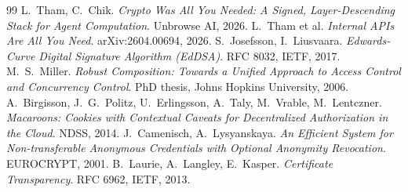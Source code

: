 \documentclass[11pt]{article}
\begin{document}
\begin{thebibliography}{99}
 L.~Tham, C.~Chik. \emph{Crypto Was All You Needed: A Signed,
Layer-Descending Stack for Agent Computation}. Unbrowse AI, 2026.
 L.~Tham et al. \emph{Internal APIs Are All You Need}.
arXiv:2604.00694, 2026.
 S.~Josefsson, I.~Liusvaara. \emph{Edwards-Curve Digital Signature
Algorithm (EdDSA)}. RFC 8032, IETF, 2017.
 M.~S.~Miller. \emph{Robust Composition: Towards a Unified Approach to
Access Control and Concurrency Control}. PhD thesis, Johns Hopkins University, 2006.
 A.~Birgisson, J.~G.~Politz, U.~Erlingsson, A.~Taly, M.~Vrable,
M.~Lentczner. \emph{Macaroons: Cookies with Contextual Caveats for Decentralized
Authorization in the Cloud}. NDSS, 2014.
 J.~Camenisch, A.~Lysyanskaya. \emph{An Efficient System for
Non-transferable Anonymous Credentials with Optional Anonymity Revocation}.
EUROCRYPT, 2001.
 B.~Laurie, A.~Langley, E.~Kasper. \emph{Certificate Transparency}.
RFC 6962, IETF, 2013.
\end{thebibliography}
\end{document}
